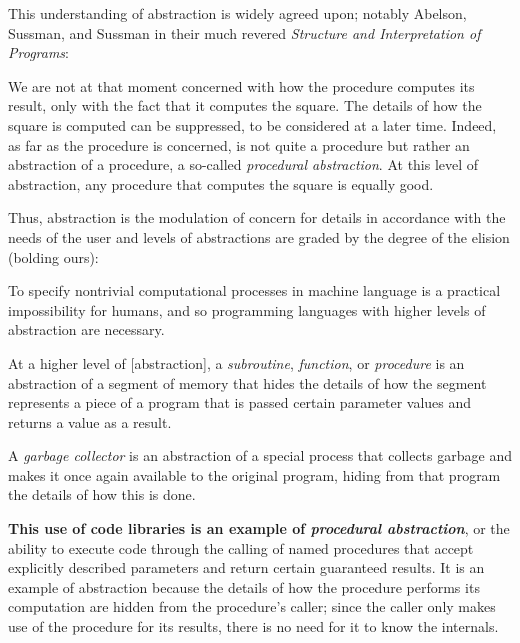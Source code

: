This understanding of abstraction is widely agreed upon;
notably Abelson, Sussman, and Sussman in their much revered \textit{Structure and Interpretation of Programs}:
\begin{displayquote}
    We are not at that moment concerned with how the procedure computes its result, only with the fact that it computes the square.
    The details of how the square is computed can be suppressed, to be considered at a later time.
    Indeed, as far as the  procedure is concerned,  is not quite a procedure but rather an abstraction of a procedure, a so-called \textit{procedural abstraction}.
    At this level of abstraction, any procedure that computes the square is equally good.
\end{displayquote}

Thus, abstraction is the modulation of concern for details in accordance with the needs of the user and levels of abstractions are graded by the degree of the elision (bolding ours):
\begin{displayquote}
    To specify nontrivial computational processes in machine language is a practical impossibility for humans, and so programming languages with higher levels of abstraction are necessary.

    \vspace{4pt}

    \textellipsis At a higher level of [abstraction], a \textit{subroutine}, \textit{function}, or \textit{procedure} is an abstraction of a segment of memory that hides the details of how the segment represents a piece of a program that is passed certain parameter values and returns a value as a result.

    \vspace{4pt}

    \textellipsis A \textit{garbage collector} is an abstraction of a special process that collects garbage and makes it once again available to the original program, hiding from that program the details of how this is done.


    \vspace{4pt}

    \textellipsis \textbf{This use of code libraries is an example of \textit{procedural abstraction}}, or the ability to execute code through the calling of named procedures that accept explicitly described parameters and return certain guaranteed results.
    It is an example of abstraction because the details of how the procedure performs its computation are hidden from the procedure's caller;
    since the caller only makes use of the procedure for its results, there is no need for it to know the internals.
\end{displayquote}


